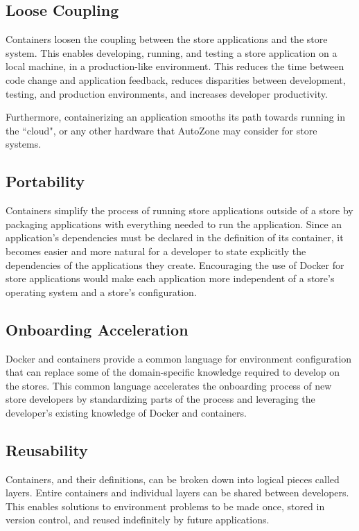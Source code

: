 \documentclass{article}
\begin{document}
\subsection{Loose Coupling}
Containers loosen the coupling between the store applications and the store system. This enables developing, running, and testing a store application on a local machine, in a production-like environment. This reduces the time between code change and application feedback, reduces disparities between development, testing, and production environments, and increases developer productivity.

Furthermore, containerizing an application smooths its path towards running in the ``cloud", or any other hardware that AutoZone may consider for store systems.

\subsection{Portability}
Containers simplify the process of running store applications outside of a store by packaging applications with everything needed to run the application. Since an application's dependencies must be declared in the definition of its container, it becomes easier and more natural for a developer to state explicitly the dependencies of the applications they create. Encouraging the use of Docker for store applications would make each application more independent of a store's operating system and a store's configuration.

\subsection{Onboarding Acceleration}
Docker and containers provide a common language for environment configuration that can replace some of the domain-specific knowledge required to develop on the stores. This common language accelerates the onboarding process of new store developers by standardizing parts of the process and leveraging the developer's existing knowledge of Docker and containers.

\subsection{Reusability}
Containers, and their definitions, can be broken down into logical pieces called layers. Entire containers and individual layers can be shared between developers. This enables solutions to environment problems to be made once, stored in version control, and reused indefinitely by future applications.
\end{document}
